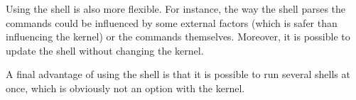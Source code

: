 Using the shell is also more flexible. For instance, the way the shell parses the commands could be influenced by some external factors (which is safer than influencing the kernel) or the commands themselves. Moreover, it is possible to update the shell without changing the kernel.

A final advantage of using the shell is that it is possible to run several shells at once, which is obviously not an option with the kernel.
